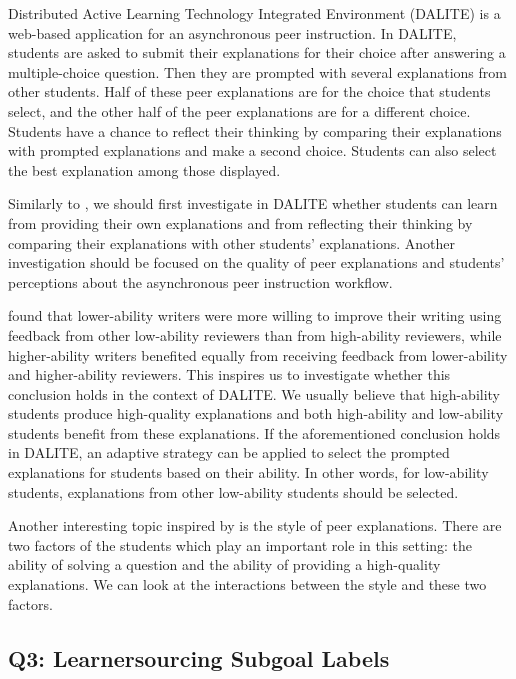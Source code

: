 \documentclass{article}
\begin{document}
Distributed Active Learning Technology Integrated Environment
(DALITE) \cite{bhatnagar2015analysis} is a web-based application for an asynchronous peer
instruction. In DALITE, students are asked to submit their
explanations for their choice after answering a multiple-choice
question. Then they are prompted with several explanations from other
students. Half of these peer explanations are for the choice that
students select, and the other half of the peer explanations are for a
different choice. Students have a chance to reflect their thinking by
comparing their explanations with prompted explanations and make a
second choice. Students can also select the best explanation among
those displayed.

Similarly to \cite{cho2006validity, schunn2016reliability}, we should
first investigate in DALITE whether students can learn from providing their own explanations and from reflecting their thinking by
comparing their explanations with other students'
explanations. Another investigation should be focused on the quality
of peer explanations and students' perceptions about the asynchronous
peer instruction workflow.

\cite{patchan2016understanding} found that lower-ability writers were more
willing to improve their writing using feedback from other low-ability
reviewers than from high-ability reviewers, while higher-ability
writers benefited equally from receiving feedback from lower-ability
and higher-ability reviewers. This inspires us to investigate whether
this conclusion holds in the context of DALITE. We usually believe
that high-ability students produce high-quality explanations and both
high-ability and low-ability students benefit from these
explanations. If the aforementioned conclusion holds in DALITE, an
adaptive strategy can be applied to select the prompted explanations
for students based on their ability. In other words, for low-ability students,
explanations from other low-ability students should be selected.

Another interesting topic inspired by \cite{patchan2015understanding}
is the style of peer explanations. There are two factors of the
students which play an important role in this
setting: the ability of solving a question and the ability of providing
a high-quality explanations. We can look at the interactions between
the style and these two factors.

\subsection{Q3: Learnersourcing Subgoal Labels}
\end{document}
